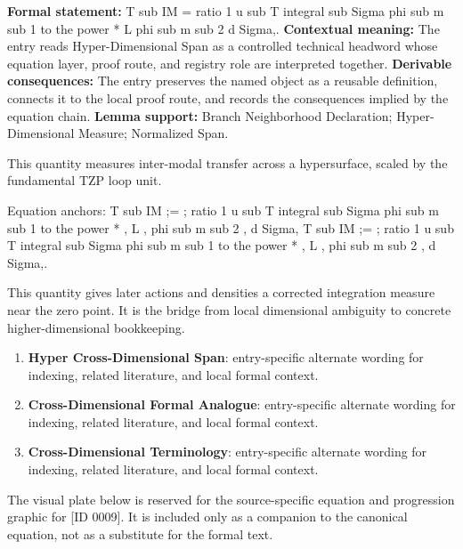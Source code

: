 \begingroup\footnotesize\setlength{\emergencystretch}{3em}\sloppy
\textbf{Formal statement:} T sub IM = ratio 1 u sub T integral sub Sigma phi sub m sub 1 to the power * L phi sub m sub 2 d Sigma,. \textbf{Contextual meaning:} The entry reads Hyper-Dimensional Span as a controlled technical headword whose equation layer, proof route, and registry role are interpreted together. \textbf{Derivable consequences:} The entry preserves the named object as a reusable definition, connects it to the local proof route, and records the consequences implied by the equation chain. \textbf{Lemma support:} Branch Neighborhood Declaration; Hyper-Dimensional Measure; Normalized Span.\par
\endgroup

This quantity measures inter-modal transfer across a hypersurface, scaled by the fundamental TZP loop unit.

Equation anchors: T sub IM ;= ; ratio 1 u sub T integral sub Sigma phi sub m sub 1 to the power * , L , phi sub m sub 2 , d Sigma, T sub IM ;= ; ratio 1 u sub T integral sub Sigma phi sub m sub 1 to the power * , L , phi sub m sub 2 , d Sigma,.

This quantity gives later actions and densities a corrected integration measure near the zero point. It is the bridge from local dimensional ambiguity to concrete higher-dimensional bookkeeping.
\endgroup

\begingroup\footnotesize\sloppy
\begin{enumerate}[leftmargin=1.35em,itemsep=1pt,topsep=1pt,parsep=0pt]
\item \textbf{Hyper Cross-Dimensional Span}: entry-specific alternate wording for indexing, related literature, and local formal context.
\item \textbf{Cross-Dimensional Formal Analogue}: entry-specific alternate wording for indexing, related literature, and local formal context.
\item \textbf{Cross-Dimensional Terminology}: entry-specific alternate wording for indexing, related literature, and local formal context.
\end{enumerate}
\endgroup

\begingroup\footnotesize\sloppy
The visual plate below is reserved for the source-specific equation and progression graphic for [ID 0009]. It is included only as a companion to the canonical equation, not as a substitute for the formal text.
\par\endgroup
\ifTZPDarkEdition
{}
\fi

